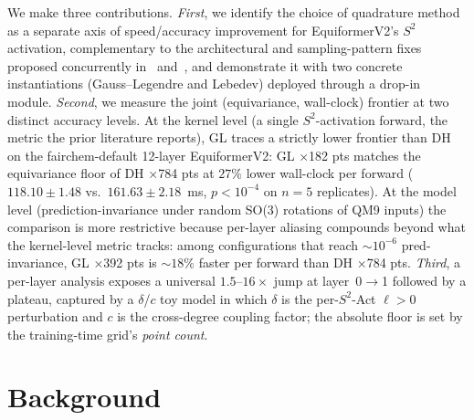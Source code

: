 \documentclass{article}
\begin{document}
We make three contributions. \emph{First}, we identify the choice of
quadrature method as a separate axis of speed/accuracy improvement
for EquiformerV2's $S^2$ activation, complementary to the
architectural and sampling-pattern fixes proposed concurrently
in~\cite{equiformerv3} and~\cite{est}, and demonstrate it with two
concrete instantiations (Gauss--Legendre and Lebedev) deployed
through a drop-in module. \emph{Second}, we measure the joint
(equivariance, wall-clock) frontier at two distinct accuracy levels.
At the kernel level (a single $S^2$-activation forward, the metric
the prior literature reports), GL traces a strictly lower frontier
than DH on the fairchem-default 12-layer EquiformerV2: GL ×182 pts
matches the equivariance floor of DH ×784 pts at $27\%$ lower
wall-clock per forward ($118.10 \pm 1.48$ vs.\ $161.63 \pm 2.18$~ms,
$p < 10^{-4}$ on $n{=}5$ replicates). At the model level
(prediction-invariance under random SO(3) rotations of QM9 inputs)
the comparison is more restrictive because per-layer aliasing
compounds beyond what the kernel-level metric tracks: among
configurations that reach $\sim 10^{-6}$ pred-invariance, GL ×392 pts
is $\sim 18\%$ faster per forward than DH ×784 pts. \emph{Third},
a per-layer analysis exposes a universal $1.5$--$16\times$ jump at
layer~0$\to$1 followed by a plateau, captured by a $\delta$/$c$ toy
model in which $\delta$ is the per-$S^2$-Act $\ell{>}0$ perturbation
and $c$ is the cross-degree coupling factor; the absolute floor is
set by the training-time grid's \emph{point count}.

\section{Background}
\label{sec:bg}
\end{document}
